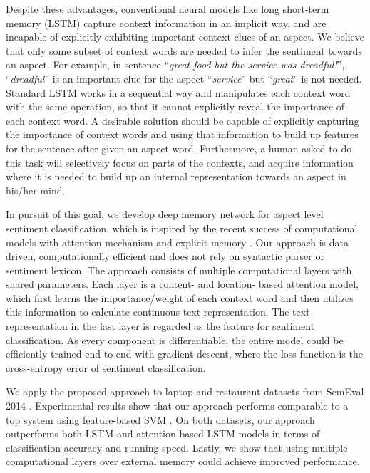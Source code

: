 \documentclass[11pt,letterpaper]{article}
\begin{document}
Despite these advantages, conventional neural models like long short-term memory (LSTM) \cite{Tang2015arxiv}  capture context information in an implicit way, and are incapable of explicitly exhibiting important context clues of an aspect.
We believe that only some subset of context words are needed to infer the sentiment towards an aspect. For example, in sentence ``\textit{great food but the service was dreadful!}'', ``\textit{dreadful}'' is an important clue for the aspect ``\textit{service}'' but ``\textit{great}'' is not needed. Standard LSTM works in a sequential way and manipulates each context word with the same operation, so that it cannot explicitly reveal the importance of each context word. 
A desirable solution should be capable of explicitly capturing the importance of context words and using that information to build up features for the sentence after given an aspect word. 
Furthermore, a human asked to do this task will selectively focus on parts of the contexts, and acquire information where it is needed to build up an internal representation towards an aspect in his/her mind.


In pursuit of this goal, we develop deep memory network for aspect level sentiment classification, which is inspired by the recent success of computational models with attention mechanism and explicit memory \cite{Graves2014neural,Bahdanau2015,Sukhbaatar2015end}.
Our approach is data-driven, computationally efficient and does not rely on syntactic parser or sentiment lexicon. 
The approach consists of multiple computational layers with shared parameters.
Each layer is a content- and location- based attention model, which first learns the importance/weight of each context word and then utilizes this information to calculate continuous text representation. 
The text representation in the last layer is regarded as the feature for sentiment classification. 
As every component is differentiable, the entire model could be efficiently trained end-to-end with gradient descent, where the loss function is the cross-entropy error of sentiment classification.

We apply the proposed approach to laptop and restaurant datasets from SemEval 2014 \cite{Pontiki2014}. 
Experimental results show that our approach performs comparable to a top system using feature-based SVM \cite{Kiritchenko2014-SemEval}.
On both datasets, our approach outperforms both LSTM and attention-based LSTM models \cite{Tang2015arxiv} in terms of classification accuracy and running speed. 
Lastly, we show that using multiple computational layers over external memory could achieve improved performance.
\end{document}
